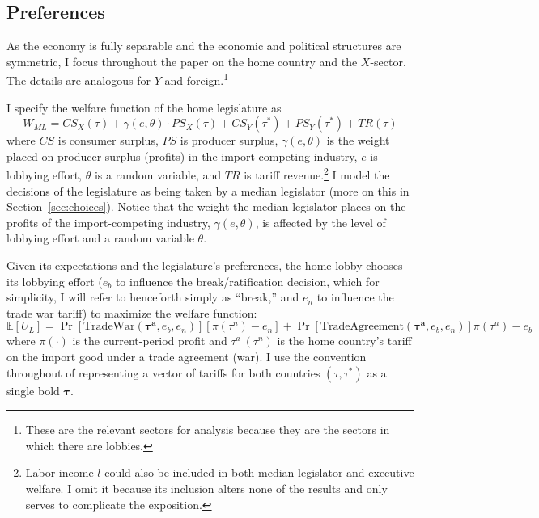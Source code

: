 \documentclass[10pt]{article}
\newcommand{\ve}{\theta}
\newcommand{\ta}{\theta}
\newcommand{\expect}{\mathbb{E}}
\newcommand{\bta}{\bm{\tau^a}}
\newcommand{\ga}{\gamma}
\begin{document}
\subsection{Preferences}
\label{sec:pref}
As the economy is fully separable and the economic and political structures are symmetric, I focus throughout the paper on the home country and the $X$-sector. The details are analogous for $Y$ and foreign.\footnote{These are the relevant sectors for analysis because they are the sectors in which there are lobbies.}

I specify the welfare function of the home legislature as
\begin{equation}
  W_{\mathit{ML}} = \mathit{CS}_X(\tau) + \ga(e,\ve) \cdot \mathit{PS}_X(\tau) + \mathit{CS}_Y(\tau^*) + \mathit{PS}_Y(\tau^*) + \mathit{TR}(\tau)
  \label{eq:ml}
\end{equation}
where $\mathit{CS}$ is consumer surplus, $\mathit{PS}$ is producer surplus, $\ga(e,\ta)$ is the weight placed on producer surplus (profits) in the import-competing industry, $e$ is lobbying effort, $\ta$ is a random variable, and $\mathit{TR}$ is tariff revenue.\footnote{Labor income $l$ could also be included in both median legislator and executive welfare. I omit it because its inclusion alters none of the results and only serves to complicate the exposition.} I model the decisions of the legislature as being taken by a median legislator (more on this in Section~\ref{sec:choices}). Notice that the weight the median legislator places on the profits of the import-competing industry, $\ga(e,\ve)$, is affected by the level of lobbying effort and a random variable $\ta$. 

Given its expectations and the legislature's preferences, the home lobby chooses its lobbying effort ($e_b$ to influence the break/ratification decision, which for simplicity, I will refer to henceforth simply as ``break,'' and $e_n$ to influence the trade war tariff) to maximize the welfare function:
\begin{equation}
  \expect \left[U_L \right] = \Pr\left[ \text{TradeWar}(\bta,e_b,e_n) \right] \left[ \pi(\tau^{\mathit{n}}) - e_n \right] + \Pr\left[ \text{TradeAgreement}(\bta,e_b,e_n) \right] \pi(\tau^a) - e_b
  \label{eq:lv}
\end{equation}
where $\pi(\cdot)$ is the current-period profit and $\tau^a \ (\tau^\mathit{n})$ is the home country's tariff on the import good under a trade agreement (war). I use the convention throughout of representing a vector of tariffs for both countries $(\tau,\tau^*)$ as a single bold $\bm{\tau}$. 
\end{document}
